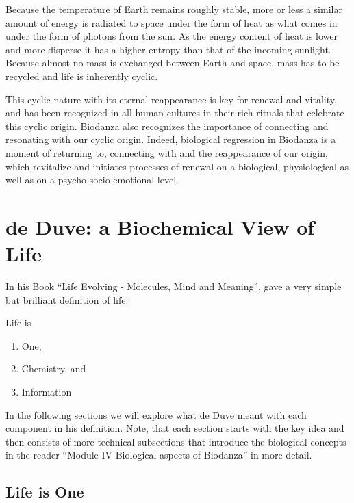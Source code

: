 \documentclass[
  11pt,
]{book}
\providecommand{\tightlist}{%
  \setlength{\itemsep}{0pt}\setlength{\parskip}{0pt}}
\begin{document}
Because the temperature of Earth remains roughly stable, more or less a similar amount of energy is radiated to space under the form of heat as what comes in under the form of photons from the sun. As the energy content of heat is lower and more disperse it has a higher entropy than that of the incoming sunlight.
Because almost no mass is exchanged between Earth and space, mass has to be recycled and life is inherently cyclic.

This cyclic nature with its eternal reappearance is key for renewal and vitality, and has been recognized in all human cultures in their rich rituals that celebrate this cyclic origin. Biodanza also recognizes the importance of connecting and resonating with our cyclic origin. Indeed, biological regression in Biodanza is a moment of returning to, connecting with and the reappearance of our origin, which revitalize and initiates processes of renewal on a biological, physiological as well as on a psycho-socio-emotional level.

\newpage

\hypertarget{de-duve-a-biochemical-view-of-life}{%
\section{de Duve: a Biochemical View of Life}\label{de-duve-a-biochemical-view-of-life}}

In his Book ``Life Evolving - Molecules, Mind and Meaning'', \citet{deDuve2002} gave a very simple but brilliant definition of life:

Life is

\begin{enumerate}
\def\labelenumi{\arabic{enumi}.}
\tightlist
\item
  One,
\item
  Chemistry, and
\item
  Information
\end{enumerate}

In the following sections we will explore what de Duve meant with each component in his definition. Note, that each section starts with the key idea and then consists of more technical subsections that introduce the biological concepts in the reader ``Module IV Biological aspects of Biodanza'' in more detail.

\hypertarget{lifeOne}{%
\subsection{Life is One}\label{lifeOne}}
\end{document}
